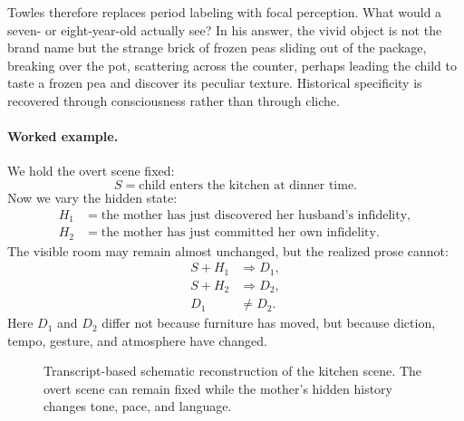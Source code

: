 Towles therefore replaces period labeling with focal perception. What would a seven- or eight-year-old actually see? In his answer, the vivid object is not the brand name but the strange brick of frozen peas sliding out of the package, breaking over the pot, scattering across the counter, perhaps leading the child to taste a frozen pea and discover its peculiar texture. Historical specificity is recovered through consciousness rather than through cliche.

\paragraph{Worked example.}

We hold the overt scene fixed:
\begin{equation}
S = \text{child enters the kitchen at dinner time}.
\end{equation}
Now we vary the hidden state:
\begin{align}
H_1 &= \text{the mother has just discovered her husband's infidelity}, \\
H_2 &= \text{the mother has just committed her own infidelity}.
\end{align}
The visible room may remain almost unchanged, but the realized prose cannot:
\begin{align}
S + H_1 &\Rightarrow D_1, \\
S + H_2 &\Rightarrow D_2, \\
D_1 &\neq D_2.
\end{align}
Here \(D_1\) and \(D_2\) differ not because furniture has moved, but because diction, tempo, gesture, and atmosphere have changed.

\begin{figure}[h]
\centering
{}
\caption{Transcript-based schematic reconstruction of the kitchen scene. The overt scene can remain fixed while the mother's hidden history changes tone, pace, and language.}
\end{figure}


